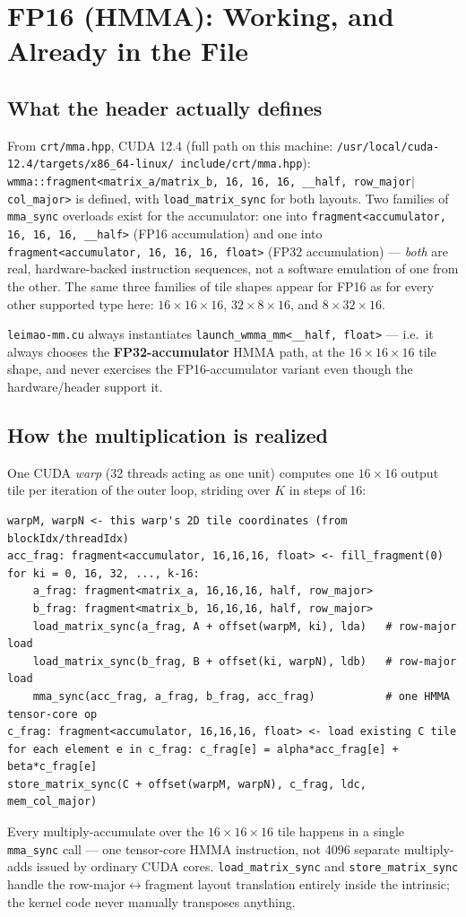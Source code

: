 \documentclass[11pt]{article}
\begin{document}
\section{FP16 (HMMA): Working, and Already in the File}
\label{sec:fp16}

\subsection{What the header actually defines}
From \texttt{crt/mma.hpp}, CUDA 12.4 (full path on this machine:
\texttt{/usr/local/cuda-12.4/targets/\allowbreak x86\_64-linux/\allowbreak
include/crt/mma.hpp}): \texttt{wmma::fragment<matrix\_a/matrix\_b, 16, 16,
16, \_\_half, row\_major$|$col\_major>} is defined, with \texttt{load\_matrix\_sync} for
both layouts. Two families of \texttt{mma\_sync} overloads exist for the accumulator:
one into \texttt{fragment<accumulator, 16, 16, 16, \_\_half>} (FP16 accumulation) and one
into \texttt{fragment<accumulator, 16, 16, 16, float>} (FP32 accumulation) --- \emph{both}
are real, hardware-backed instruction sequences, not a software emulation of one from the
other. The same three families of tile shapes appear for FP16 as for every other
supported type here: $16\!\times\!16\!\times\!16$, $32\!\times\!8\!\times\!16$, and
$8\!\times\!32\!\times\!16$.

\texttt{leimao-mm.cu} always instantiates \texttt{launch\_wmma\_mm<\_\_half, float>} ---
i.e.\ it always chooses the \textbf{FP32-accumulator} HMMA path, at the
$16\times16\times16$ tile shape, and never exercises the FP16-accumulator variant even
though the hardware/header support it.

\subsection{How the multiplication is realized}
One CUDA \emph{warp} (32 threads acting as one unit) computes one $16\times16$ output
tile per iteration of the outer loop, striding over $K$ in steps of 16:
\begin{lstlisting}
warpM, warpN <- this warp's 2D tile coordinates (from blockIdx/threadIdx)
acc_frag: fragment<accumulator, 16,16,16, float> <- fill_fragment(0)
for ki = 0, 16, 32, ..., k-16:
    a_frag: fragment<matrix_a, 16,16,16, half, row_major>
    b_frag: fragment<matrix_b, 16,16,16, half, row_major>
    load_matrix_sync(a_frag, A + offset(warpM, ki), lda)   # row-major load
    load_matrix_sync(b_frag, B + offset(ki, warpN), ldb)   # row-major load
    mma_sync(acc_frag, a_frag, b_frag, acc_frag)           # one HMMA tensor-core op
c_frag: fragment<accumulator, 16,16,16, float> <- load existing C tile
for each element e in c_frag: c_frag[e] = alpha*acc_frag[e] + beta*c_frag[e]
store_matrix_sync(C + offset(warpM, warpN), c_frag, ldc, mem_col_major)
\end{lstlisting}
Every multiply-accumulate over the $16\times16\times16$ tile happens in a single
\texttt{mma\_sync} call --- one tensor-core HMMA instruction, not 4096 separate
multiply-adds issued by ordinary CUDA cores. \texttt{load\_matrix\_sync} and
\texttt{store\_matrix\_sync} handle the row-major$\leftrightarrow$fragment layout
translation entirely inside the intrinsic; the kernel code never manually transposes
anything.
\end{document}
